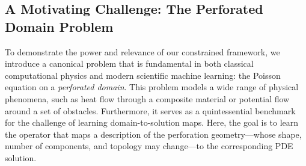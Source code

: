 \documentclass[pdflatex,sn-mathphys-num]{sn-jnl}%
\theoremstyle{thmstyleone}%
\numberwithin{equation}{section}
\begin{document}
\subsection{A Motivating Challenge: The Perforated Domain Problem}
\label{sec:motivating_example}

To demonstrate the power and relevance of our constrained framework, we introduce a canonical problem that is fundamental in both classical computational physics and modern scientific machine learning: the Poisson equation on a \textit{perforated domain}. This problem models a wide range of physical phenomena, such as heat flow through a composite material or potential flow around a set of obstacles. Furthermore, it serves as a quintessential benchmark for the challenge of learning domain-to-solution maps. Here, the goal is to learn the operator that maps a description of the perforation geometry—whose shape, number of components, and topology may change—to the corresponding PDE solution.
\end{document}
